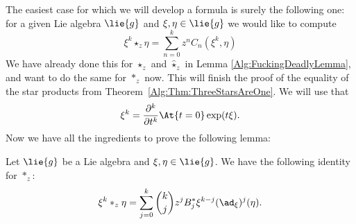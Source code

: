 The easiest case for which we will develop a formula is surely the 
following one: for a given Lie algebra $\lie{g}$ and $\xi, \eta \in 
\lie{g}$ we would like to compute
\begin{equation*}
    \xi^k \star_z \eta
    =
    \sum\limits_{n=0}^k
    z^n C_n(\xi^k, \eta)
\end{equation*}
We have already done this for $\star_z$ and $\widehat{\star}_z$ in Lemma 
\ref{Alg:FuckingDeadlyLemma}, and want to do the same for $\ast_z$ now. This will finish the proof of the equality of 
the star products from Theorem~\ref{Alg:Thm:ThreeStarsAreOne}. We will use that
\begin{equation}\label{Formulas:MonomialDerivative}
    \xi^k
    =
    \frac{\partial^k}{\partial t^k}
    \At{t = 0} \exp(t \xi).
\end{equation}
Now we have all the ingredients to prove the following lemma:
\begin{lemma}
    \label{Formulas:Lemma:LinearMonomial1}
    Let $\lie{g}$ be a Lie algebra and $\xi, \eta \in \lie{g}$. We
    have the following identity for $\ast_z$:
    \begin{equation}
        \label{Formulas:LinearMonomial1}
        \xi^k \ast_z \eta
        =
        \sum\limits_{j=0}^k
        \binom{k}{j} z^j B_j^*
        \xi^{k-j}(\ad_{\xi})^j (\eta).
    \end{equation}
\end{lemma}

